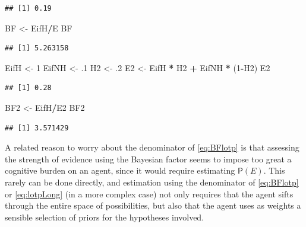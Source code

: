 \documentclass[10pt,dvipsnames,enabledeprecatedfontcommands]{scrartcl}
\newenvironment{Shaded}{\begin{snugshade}}{\end{snugshade}}
\newcommand{\DecValTok}[1]{\textcolor[rgb]{0.00,0.00,0.81}{#1}}
\newcommand{\FloatTok}[1]{\textcolor[rgb]{0.00,0.00,0.81}{#1}}
\newcommand{\StringTok}[1]{\textcolor[rgb]{0.31,0.60,0.02}{#1}}
\newcommand{\OperatorTok}[1]{\textcolor[rgb]{0.81,0.36,0.00}{\textbf{#1}}}
\newcommand{\NormalTok}[1]{#1}
\newcommand{\pr}[1]{\mathsf{P}(#1)}
\begin{document}
\begin{verbatim}
## [1] 0.19
\end{verbatim}

\begin{Shaded}
\begin{Highlighting}[]
\NormalTok{BF <-}\StringTok{ }\NormalTok{EifH}\OperatorTok{/}\NormalTok{E}
\NormalTok{BF}
\end{Highlighting}
\end{Shaded}

\begin{verbatim}
## [1] 5.263158
\end{verbatim}

\begin{Shaded}
\begin{Highlighting}[]
\NormalTok{EifH <-}\StringTok{ }\DecValTok{1}
\NormalTok{EifNH <-}\StringTok{ }\FloatTok{.1}
\NormalTok{H2 <-}\StringTok{ }\FloatTok{.2}
\NormalTok{E2 <-}\StringTok{ }\NormalTok{EifH }\OperatorTok{*}\StringTok{ }\NormalTok{H2 }\OperatorTok{+}\StringTok{ }\NormalTok{EifNH }\OperatorTok{*}\StringTok{ }\NormalTok{(}\DecValTok{1}\OperatorTok{-}\NormalTok{H2)}
\NormalTok{E2}
\end{Highlighting}
\end{Shaded}

\begin{verbatim}
## [1] 0.28
\end{verbatim}

\begin{Shaded}
\begin{Highlighting}[]
\NormalTok{BF2 <-}\StringTok{ }\NormalTok{EifH}\OperatorTok{/}\NormalTok{E2}
\NormalTok{BF2}
\end{Highlighting}
\end{Shaded}

\begin{verbatim}
## [1] 3.571429
\end{verbatim}

\normalsize 

\noindent A related reason to worry about the denominator of
\eqref{eq:BFlotp} is that assessing the strength of evidence using the
Bayesian factor seems to impose too great a cognitive burden on an
agent, since it would require estimating \(\pr{E}\). This rarely can be
done directly, and estimation using the denominator of \eqref{eq:BFlotp}
or \eqref{eq:lotpLong} (in a more complex case) not only requires that
the agent sifts through the entire space of possibilities, but also that
the agent uses as weights a sensible selection of priors for the
hypotheses involved.
\end{document}
